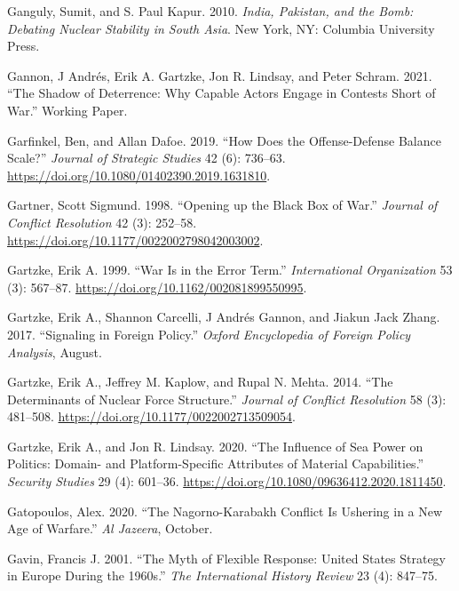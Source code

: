 \documentclass[
]{article}
\begin{document}
\leavevmode\hypertarget{ref-ganguly_indiapakistanbomb_2010}{}%
Ganguly, Sumit, and S. Paul Kapur. 2010. \emph{India, Pakistan, and the Bomb: Debating Nuclear Stability in South Asia}. New York, NY: Columbia University Press.

\leavevmode\hypertarget{ref-gannon_shadowdeterrencewhy_2021}{}%
Gannon, J Andrés, Erik A. Gartzke, Jon R. Lindsay, and Peter Schram. 2021. ``The Shadow of Deterrence: Why Capable Actors Engage in Contests Short of War.'' Working Paper.

\leavevmode\hypertarget{ref-garfinkel_howdoesoffensedefense_2019}{}%
Garfinkel, Ben, and Allan Dafoe. 2019. ``How Does the Offense-Defense Balance Scale?'' \emph{Journal of Strategic Studies} 42 (6): 736--63. \url{https://doi.org/10.1080/01402390.2019.1631810}.

\leavevmode\hypertarget{ref-gartner_openingblackbox_1998}{}%
Gartner, Scott Sigmund. 1998. ``Opening up the Black Box of War.'' \emph{Journal of Conflict Resolution} 42 (3): 252--58. \url{https://doi.org/10.1177/0022002798042003002}.

\leavevmode\hypertarget{ref-gartzke_warerrorterm_1999}{}%
Gartzke, Erik A. 1999. ``War Is in the Error Term.'' \emph{International Organization} 53 (3): 567--87. \url{https://doi.org/10.1162/002081899550995}.

\leavevmode\hypertarget{ref-gartzke_signalingforeignpolicy_2017}{}%
Gartzke, Erik A., Shannon Carcelli, J Andrés Gannon, and Jiakun Jack Zhang. 2017. ``Signaling in Foreign Policy.'' \emph{Oxford Encyclopedia of Foreign Policy Analysis}, August.

\leavevmode\hypertarget{ref-gartzke_determinantsnuclearforce_2014}{}%
Gartzke, Erik A., Jeffrey M. Kaplow, and Rupal N. Mehta. 2014. ``The Determinants of Nuclear Force Structure.'' \emph{Journal of Conflict Resolution} 58 (3): 481--508. \url{https://doi.org/10.1177/0022002713509054}.

\leavevmode\hypertarget{ref-gartzke_influenceseapower_2020}{}%
Gartzke, Erik A., and Jon R. Lindsay. 2020. ``The Influence of Sea Power on Politics: Domain- and Platform-Specific Attributes of Material Capabilities.'' \emph{Security Studies} 29 (4): 601--36. \url{https://doi.org/10.1080/09636412.2020.1811450}.

\leavevmode\hypertarget{ref-gatopoulos_nagornokarabakhconflictushering_2020}{}%
Gatopoulos, Alex. 2020. ``The Nagorno-Karabakh Conflict Is Ushering in a New Age of Warfare.'' \emph{Al Jazeera}, October.

\leavevmode\hypertarget{ref-gavin_mythflexibleresponse_2001}{}%
Gavin, Francis J. 2001. ``The Myth of Flexible Response: United States Strategy in Europe During the 1960s.'' \emph{The International History Review} 23 (4): 847--75.
\end{document}
